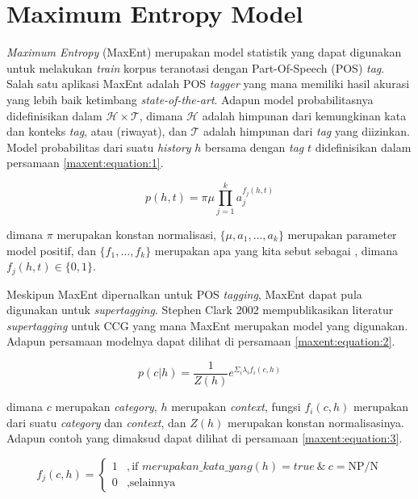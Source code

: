 \section{Maximum Entropy Model}
\textit{Maximum Entropy} (MaxEnt) merupakan model statistik yang dapat digunakan untuk
melakukan \textit{train} korpus teranotasi dengan Part-Of-Speech (POS) \textit{tag}.
Salah satu aplikasi MaxEnt adalah POS \textit{tagger} yang mana memiliki hasil akurasi
yang lebih baik ketimbang \textit{state-of-the-art}.
Adapun model probabilitasnya didefinisikan dalam $\mathcal{H}\times\mathcal{T}$,
dimana $\mathcal{H}$ adalah himpunan dari kemungkinan kata dan konteks \textit{tag},
atau  (riwayat), dan $\mathcal{T}$ adalah himpunan dari
\textit{tag} yang diizinkan.
Model probabilitas dari suatu \textit{history} $h$ bersama dengan \textit{tag} $t$
didefinisikan dalam persamaan \ref{maxent:equation:1}.

\begin{equation}\label{maxent:equation:1}
  p(h, t) = \pi\mu\prod_{j = 1}^{k} a_{j}^{f_{j}(h, t)}
\end{equation}

\noindent
dimana $\pi$ merupakan konstan normalisasi,
$\{\mu, a_1, \dots, a_k\}$ merupakan parameter model positif,
dan $\{f_1, \dots, f_k\}$ merupakan apa yang kita sebut sebagai
,
dimana $f_j(h, t) \in \{0, 1\}$.

Meskipun MaxEnt dipernalkan untuk POS \textit{tagging},
MaxEnt dapat pula digunakan untuk \textit{supertagging}.
Stephen Clark 2002 mempublikasikan literatur \textit{supertagging} untuk CCG yang
mana MaxEnt merupakan model yang digunakan.
Adapun persamaan modelnya dapat dilihat di persamaan \ref{maxent:equation:2}.

\begin{equation}\label{maxent:equation:2}
  p(c|h) = \frac{1}{Z(h)} e^{\Sigma_i \lambda_if_i(c, h)}
\end{equation}

\noindent
dimana $c$ merupakan \textit{category}, $h$ merupakan \textit{context},
fungsi $f_i(c, h)$ merupakan  dari suatu
\textit{category} dan \textit{context}, dan $Z(h)$ merupakan konstan normalisasinya.
Adapun contoh  yang dimaksud dapat dilihat di persamaan
\ref{maxent:equation:3}.

\begin{equation}\label{maxent:equation:3}
  f_j(c, h) =
  \begin{cases}
    1 &, \text{if } merupakan\_kata\_yang(h) = true\ \&\ c = \text{NP/N}\\
    0 &, \text{selainnya}
  \end{cases}
\end{equation}
